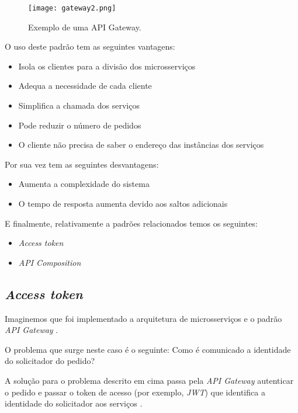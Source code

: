 \begin{figure}[H]
	\centering
	\texttt{[image: gateway2.png]}
	\caption{Exemplo de uma API Gateway.}
	\label{fig:gateway2}
\end{figure}

O uso deste padrão tem as seguintes vantagens:
\begin{itemize}
    \item Isola os clientes para a divisão dos microsserviços \cite{apiGatewayPattern}
    \item Adequa a necessidade de cada cliente \cite{apiGatewayPattern}
    \item Simplifica a chamada dos serviços \cite{apiGatewayPattern}
    \item Pode reduzir o número de pedidos \cite{apiGatewayPattern}
    \item O cliente não precisa de saber o endereço das instâncias dos serviços \cite{apiGatewayPattern}
\end{itemize}

Por sua vez tem as seguintes desvantagens:
\begin{itemize}
    \item Aumenta a complexidade do sistema \cite{apiGatewayPattern}
    \item O tempo de resposta aumenta devido aos saltos adicionais  \cite{apiGatewayPattern}
\end{itemize}

E finalmente, relativamente a padrões relacionados temos os seguintes:
\begin{itemize}
    \item \textit{Access token}
    \item \textit{API Composition}
\end{itemize}

\subsection{\textit{Access token}}

Imaginemos que foi implementado a arquitetura de microsserviços e o padrão \textit{API Gateway} \cite{accessTokenPattern}. 

O problema que surge neste caso é o seguinte: Como é comunicado a identidade do solicitador do pedido? \cite{accessTokenPattern}

A solução para o problema descrito em cima passa pela \textit{API Gateway} autenticar o pedido e passar o token de acesso (por exemplo, \textit{JWT}) que identifica a identidade do solicitador aos serviços \cite{accessTokenPattern}.

